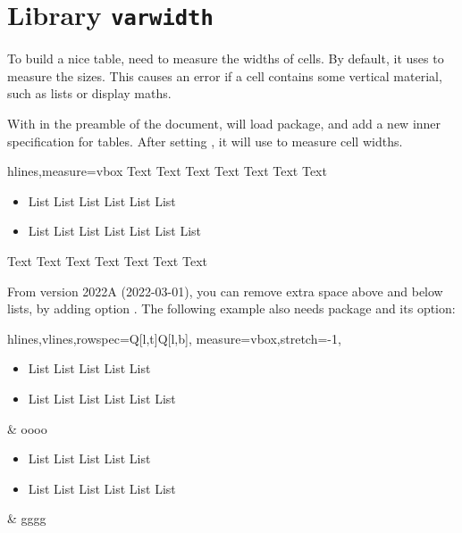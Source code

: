 \documentclass[oneside]{book}
\begin{document}
\section{Library \texttt{varwidth}}

To build a nice table,  need to measure the widths of cells.
By default, it uses \CC{\hbox} to measure the sizes.
This causes an error if a cell contains some vertical material, such as lists or display maths.

With  in the preamble of the document,
 will load  package,
and add a new inner specification  for tables.
After setting , it will use \CC{\vbox} to measure cell widths.

\begin{demohigh}
\begin{tblr}{hlines,measure=vbox}
  Text Text Text Text Text Text Text
  \begin{itemize}
    \item List List List List List List
    \item List List List List List List List
  \end{itemize}
  Text Text Text Text Text Text Text \\
\end{tblr}
\end{demohigh}

From version 2022A (2022-03-01), you can remove extra space above and below lists,
by adding option .
The following example also needs  package and its  option:

{\centering\begin{tblr}{
  hlines,vlines,rowspec={Q[l,t]Q[l,b]},
  measure=vbox,stretch=-1,
}
  \begin{itemize}[nosep]
    \item List List List List List
    \item List List List List List List
  \end{itemize} & oooo \\
  \begin{itemize}[nosep]
    \item List List List List List
    \item List List List List List List
  \end{itemize} & gggg \\
\end{tblr}\par}
\end{document}

